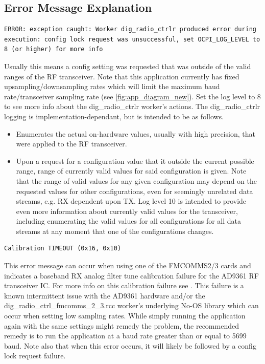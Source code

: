   \subsection{Error Message Explanation}
    \begin{lstlisting}
ERROR: exception caught: Worker dig_radio_ctrlr produced error during execution: config lock request was unsuccessful, set OCPI_LOG_LEVEL to 8 (or higher) for more info
    \end{lstlisting}
    Usually this means a config setting was requested that was outside of the
    valid ranges of the RF transceiver.
    Note that this application currently has fixed upsampling/downsampling rates
    which will limit the maximum baud rate/transceiver sampling rate
    (see \ref{fig:app_diagram_new}).
    Set the log level to 8 to see more info about the dig\_radio\_ctrlr worker's
    actions.
    The dig\_radio\_ctrlr logging is implementation-dependant, but is intended
    to
    be as follows.
    \begin{itemize}
      \item Enumerates the actual on-hardware values, usually with high
        precision,
        that were applied to the RF
        transceiver.
      \item Upon a request for a configuration value that it outside the current
        possible range, range of currently valid values for said configuration
        is given. Note that the range of valid values for any given
        configuration
        may depend on the requested values for other configurations, even
        for seemingly unrelated data streams, e.g. RX dependent upon TX.
    Log level 10 is intended to provide even more information about currently
    valid
    values for the transceiver, including enumerating the valid values for all
    configurations for all data streams at any moment that one of the
    configurations changes.
    \end{itemize}

    \begin{lstlisting}
Calibration TIMEOUT (0x16, 0x10)
    \end{lstlisting}
    This error message can occur when using one of
    the FMCOMMS2/3 cards and
    indicates a baseband RX analog filter tune calibration failure for
    the AD9361 RF transceiver IC. For more info on this calibration failure
    see \cite{adi_ug570}.
    This failure is a known intermittent issue with the AD9361 hardware
    and/or the
    dig\_radio\_ctrl\_fmcomms\_2\_3.rcc worker's underlying No-OS library which
    can occur when setting low sampling rates.
    While simply running the application again with the same settings might
    remedy the problem, the
    recommended remedy is to run the application at a baud rate greater than
    or equal to 5699 baud.
    Note also that when this error occurs, it will likely be followed by a
    config lock request
    failure.

